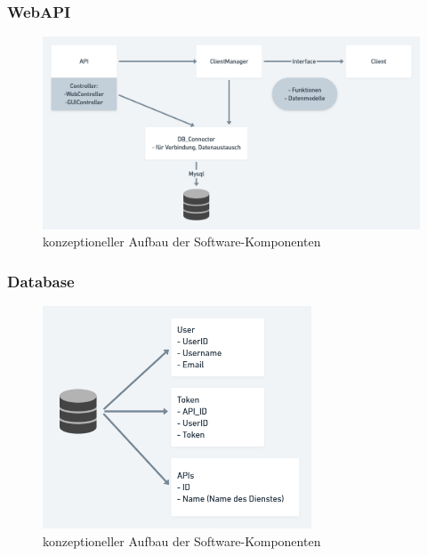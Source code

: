 \subsubsection{WebAPI}
\begin{figure}[h]
\centering
\includegraphics[width=120mm]{pictures/WebAPI.png}
\caption{konzeptioneller Aufbau der Software-Komponenten}
\end{figure}
\subsubsection{Database}
\begin{figure}[h]
\centering
\includegraphics[width=80mm]{pictures/Database.png}
\caption{konzeptioneller Aufbau der Software-Komponenten}
\end{figure}


